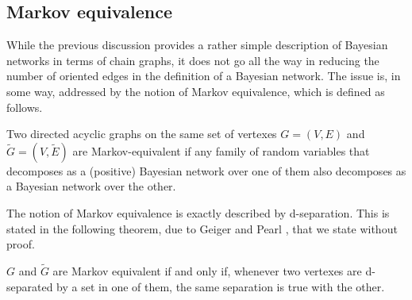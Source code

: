 \subsection{Markov equivalence}

While the previous discussion provides a rather simple description of
Bayesian networks in terms of chain graphs, it does not go all the way
in reducing the number of oriented edges in the definition of  a Bayesian
network. The issue is, in some way, addressed by the notion of Markov
equivalence, which is defined as follows.

\begin{definition}
\label{def:mar.eq}
Two directed acyclic graphs on the same set of vertexes $G = (V,E)$
and $\tilde G = (V, \tilde E)$ are Markov-equivalent
if any family of random variables that decomposes as a (positive) Bayesian network
over one of them also decomposes as a Bayesian network over the other.
\end{definition}

The notion of Markov equivalence is exactly described by
d-separation. This is stated in the following theorem, due to Geiger
and Pearl \citep{Geiger1990,geiger1990logic}, that we state without proof.
\begin{theorem}
\label{th:geig.p}
$G$ and $\tilde G$ are Markov equivalent if and only if, whenever two
vertexes are d-separated by a set in one of them, the same separation
is true with the other. 
\end{theorem}

